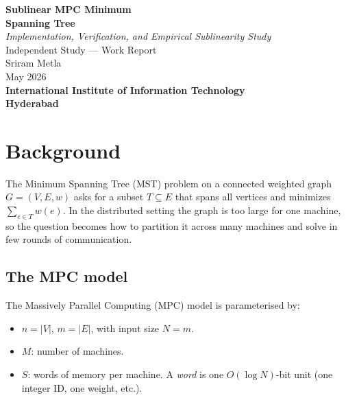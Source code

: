 \documentclass[11pt]{article}
\begin{document}
\begin{titlepage}
\begin{center}
\vspace*{3.5cm}

{\Huge \textbf{Sublinear MPC Minimum}}\\[0.2cm]
{\Huge \textbf{Spanning Tree}}\\[0.5cm]
{\Large \textit{Implementation, Verification, and Empirical Sublinearity Study}}\\[0.8cm]

{\large Independent Study --- Work Report}\\[1.5cm]

{\large Sriram Metla}\\[0.3cm]
{\large May 2026}\\[2.0cm]

\textbf{\Large International Institute of Information Technology}\\[0.2cm]
\textbf{\large Hyderabad}\\[1.0cm]
\end{center}
\thispagestyle{empty}
\end{titlepage}

\setcounter{page}{1}

\section{Background}

The Minimum Spanning Tree (MST) problem on a connected weighted graph
$G = (V, E, w)$ asks for a subset $T \subseteq E$ that spans all vertices and
minimizes $\sum_{e \in T} w(e)$. In the distributed setting the graph is too
large for one machine, so the question becomes how to partition it across many
machines and solve in few rounds of communication.

\subsection{The MPC model}

The Massively Parallel Computing (MPC) model is parameterised by:
\begin{itemize}[topsep=2pt, itemsep=2pt, leftmargin=*]
    \item $n = |V|$, $m = |E|$, with input size $N = m$.
    \item $M$: number of machines.
    \item $S$: words of memory per machine. A \textit{word} is one
          $O(\log N)$-bit unit (one integer ID, one weight, etc.).
\end{itemize}
\end{document}
